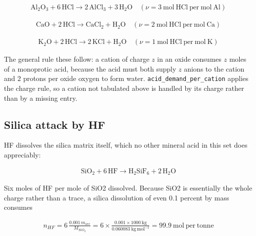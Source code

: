 \documentclass[10pt,a4paper,twoside]{report}
\begin{document}
\begin{equation*}
\begin{gathered}
\mathrm{Al_2O_3} + 6\,\mathrm{HCl} \rightarrow 2\,\mathrm{AlCl_3} + 3\,\mathrm{H_2O} \quad (\nu = 3\ \mathrm{mol\ HCl\ per\ mol\ Al})
\end{gathered}
\end{equation*}

\begin{equation*}
\begin{gathered}
\mathrm{CaO} + 2\,\mathrm{HCl} \rightarrow \mathrm{CaCl_2} + \mathrm{H_2O} \quad (\nu = 2\ \mathrm{mol\ HCl\ per\ mol\ Ca})
\end{gathered}
\end{equation*}

\begin{equation*}
\begin{gathered}
\mathrm{K_2O} + 2\,\mathrm{HCl} \rightarrow 2\,\mathrm{KCl} + \mathrm{H_2O} \quad (\nu = 1\ \mathrm{mol\ HCl\ per\ mol\ K})
\end{gathered}
\end{equation*}

The general rule these follow: a cation of charge $z$ in an oxide consumes $z$ moles of a monoprotic acid, because the acid must both supply $z$ anions to the cation and $2$ protons per oxide oxygen to form water. \texttt{acid\_demand\_per\_cation} applies the charge rule, so a cation not tabulated above is handled by its charge rather than by a missing entry.

\subsection*{Silica attack by HF}

HF dissolves the silica matrix itself, which no other mineral acid in this set does appreciably:

\begin{equation*}
\begin{gathered}
\mathrm{SiO_2} + 6\,\mathrm{HF} \rightarrow \mathrm{H_2SiF_6} + 2\,\mathrm{H_2O}
\end{gathered}
\end{equation*}

Six moles of HF per mole of SiO2 dissolved. Because SiO2 is essentially the whole charge rather than a trace, a silica dissolution of even 0.1 percent by mass consumes

\begin{equation*}
\begin{gathered}
n_{HF} = 6\,\frac{0.001\,m_{ore}}{M_{SiO_2}} = 6 \times \frac{0.001 \times 1000\ \mathrm{kg}} {0.060083\ \mathrm{kg\,mol^{-1}}} = 99.9\ \mathrm{mol\ per\ tonne}
\end{gathered}
\end{equation*}
\end{document}
